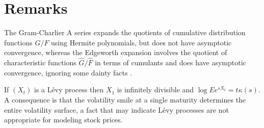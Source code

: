 \documentclass[fleqn]{amsart}
\theoremstyle{definition}
\begin{document}
\section{Remarks}
The Gram-Charlier A series expands the quotients of cumulative
distribution functions \(G/F\) using Hermite polynomials, but does not
have asymptotic convergence, whereas the Edgeworth expansion involves
the quotient of characteristic functions \(\hat G/\hat F\) in terms of
cumulants and does have asymptotic convergence, ignoring some dainty
facts \cite{Pet1975}.

If \((X_t)\) is a L\'evy process then \(X_1\) is
infinitely divisible and \(\log Ee^{sX_t} = t\kappa(s)\).
A consequence is that the volatility smile at a single
maturity determines the entire volatility surface, a fact that
may indicate L\'evy processes are not appropriate for
modeling stock prices.




\end{document}
